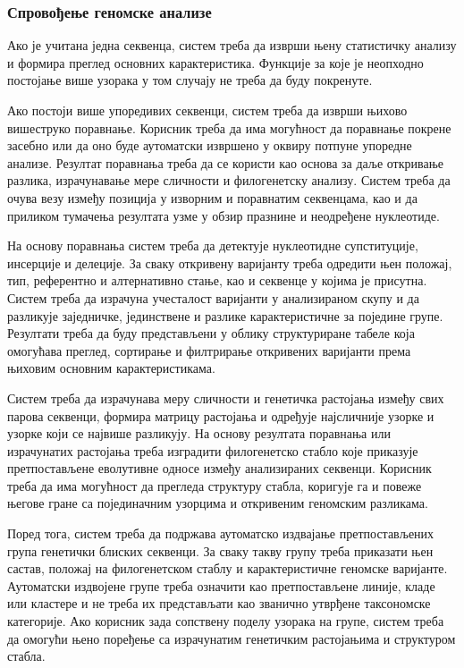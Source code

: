 \documentclass[12pt,oneside]{memoir}
\begin{document}
\subsubsection{Спровођење геномске анализе}
Ако је учитана једна секвенца, систем треба да изврши њену статистичку анализу и формира преглед основних карактеристика. Функције за које је неопходно постојање више узорака у том случају не треба да буду покренуте.

Ако постоји више упоредивих секвенци, систем треба да изврши њихово вишеструко поравнање. Корисник треба да има могућност да поравнање покрене засебно или да оно буде аутоматски извршено у оквиру потпуне упоредне анализе. Резултат поравнања треба да се користи као основа за даље откривање разлика, израчунавање мере сличности и филогенетску анализу. Систем треба да очува везу између позиција у изворним и поравнатим секвенцама, као и да приликом тумачења резултата узме у обзир празнине и неодређене нуклеотиде.

На основу поравнања систем треба да детектује нуклеотидне супституције, инсерције и делеције. За сваку откривену варијанту треба одредити њен положај, тип, референтно и алтернативно стање, као и секвенце у којима је присутна. Систем треба да израчуна учесталост варијанти у анализираном скупу и да разликује заједничке, јединствене и разлике карактеристичне за поједине групе. Резултати треба да буду представљени у облику структуриране табеле која омогућава преглед, сортирање и филтрирање откривених варијанти према њиховим основним карактеристикама.

Систем треба да израчунава меру сличности и генетичка растојања између свих парова секвенци, формира матрицу растојања и одређује најсличније узорке и узорке који се највише разликују. На основу резултата поравнања или израчунатих растојања треба изградити филогенетско стабло које приказује претпостављене еволутивне односе између анализираних секвенци. Корисник треба да има могућност да прегледа структуру стабла, коригује га и повеже његове гране са појединачним узорцима и откривеним геномским разликама.

Поред тога, систем треба да подржава аутоматско издвајање претпостављених група генетички блиских секвенци. За сваку такву групу треба приказати њен састав, положај на филогенетском стаблу и карактеристичне геномске варијанте. Аутоматски издвојене групе треба означити као претпостављене линије, кладе или кластере и не треба их представљати као званично утврђене таксономске категорије. Ако корисник зада сопствену поделу узорака на групе, систем треба да омогући њено поређење са израчунатим генетичким растојањима и структуром стабла.
\end{document}

